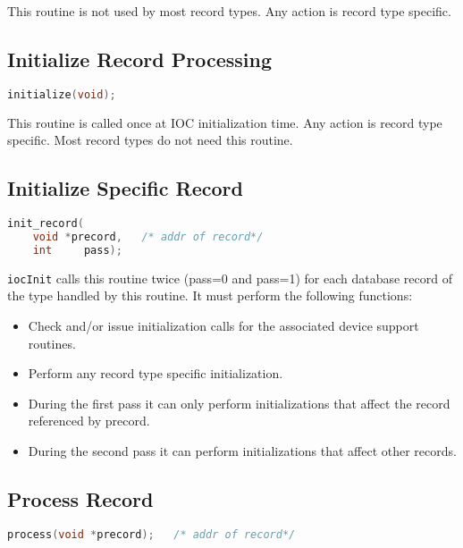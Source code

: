 This routine is not used by most record types.
Any action is record type specific.

\subsection{Initialize Record Processing}

\begin{lstlisting}[language=C]
initialize(void);
\end{lstlisting}

This routine is called once at IOC initialization time.
Any action is record type specific.
Most record types do not need this routine.

\subsection{Initialize Specific Record}

\begin{lstlisting}[language=C]
init_record(
    void *precord,   /* addr of record*/
    int     pass);
\end{lstlisting}

\verb|iocInit| calls this routine twice (pass=0 and pass=1) for each database record of the type handled by this routine.
It must perform the following functions:

\begin{itemize}
\item Check and/or issue initialization calls for the associated device support routines.

\item Perform any record type specific initialization.

\item During the first pass it can only perform initializations that affect the record referenced by precord.

\item During the second pass it can perform initializations that affect other records.

\end{itemize}

\subsection{Process Record}

\begin{lstlisting}[language=C]
process(void *precord);   /* addr of record*/
\end{lstlisting}

